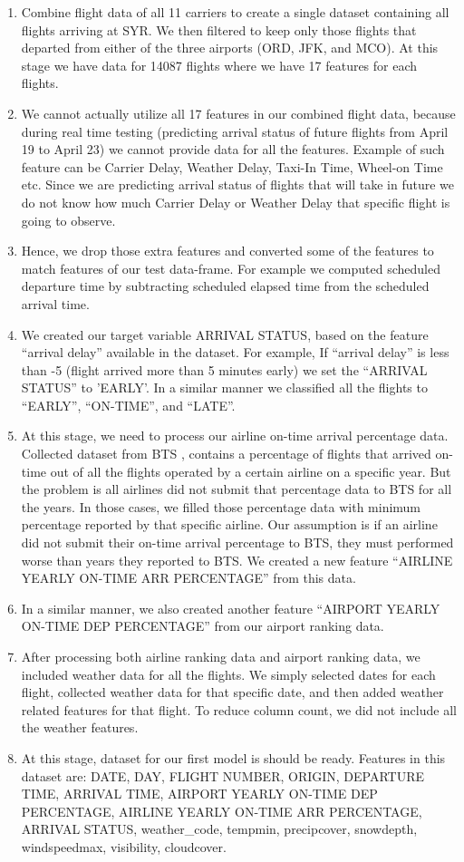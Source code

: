 \begin{enumerate}
	\item Combine flight data of all 11 carriers to create a single dataset containing all flights arriving at SYR. We then filtered to keep only those flights that departed from either of the three airports (ORD, JFK, and MCO). At this stage we have data for 14087 flights where we have 17 features for each flights. 
	\item We cannot actually utilize all 17 features in our combined flight data, because during real time testing (predicting arrival status of future flights from April 19 to April 23) we cannot provide data for all the features. Example of such feature can be Carrier Delay, Weather Delay, Taxi-In Time, Wheel-on Time etc. Since we are predicting arrival status of flights that will take in future we do not know how much Carrier Delay or Weather Delay that specific flight is going to observe. 
	\item Hence, we drop those extra features and converted some of the features to match features of our test data-frame. For example we computed scheduled departure time by subtracting scheduled elapsed time from the scheduled arrival time.
	\item We created our target variable ARRIVAL STATUS, based on the feature ``arrival delay'' available in the dataset. For example, If ``arrival delay'' is less than -5 (flight arrived more than 5 minutes early) we set the ``ARRIVAL STATUS'' to 'EARLY'. In a similar manner we classified all the flights to ``EARLY'', ``ON-TIME'', and ``LATE''.
	\item At this stage, we need to process our airline on-time arrival percentage data. Collected dataset from BTS \cite{airlineOnTimeArrival}, contains a percentage of flights that arrived on-time out of all the flights operated by a certain airline on a specific year. But the problem is all airlines did not submit that percentage data to BTS for all the years. In those cases, we filled those percentage data with minimum percentage reported by that specific airline. Our assumption is if an airline did not submit their on-time arrival percentage to BTS, they must performed worse than years they reported to BTS.
	We created a new feature ``AIRLINE YEARLY ON-TIME ARR PERCENTAGE'' from this data.
	\item In a similar manner, we also created another feature ``AIRPORT YEARLY ON-TIME DEP PERCENTAGE'' from our airport ranking data.
	\item After processing both airline ranking data and airport ranking data, we included weather data for all the flights. We simply selected dates for each flight, collected weather data for that specific date, and then added weather related features for that flight. To reduce column count, we did not include all the weather features. 
	\item At this stage, dataset for our first model is should be ready. Features in this dataset are: DATE, DAY, FLIGHT NUMBER, ORIGIN, DEPARTURE TIME, ARRIVAL TIME, AIRPORT YEARLY ON-TIME DEP PERCENTAGE, AIRLINE YEARLY ON-TIME ARR PERCENTAGE, ARRIVAL STATUS, weather\_code, tempmin, precipcover, snowdepth, windspeedmax, visibility, cloudcover.
	

\end{enumerate}
